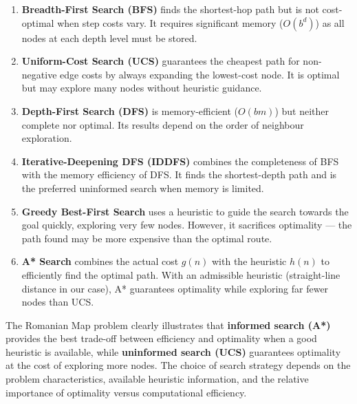 \documentclass[12pt,a4paper]{article}
\begin{document}
\begin{enumerate}
  \item \textbf{Breadth-First Search (BFS)} finds the shortest-hop path but is not cost-optimal when step costs vary. It requires significant memory ($O(b^d)$) as all nodes at each depth level must be stored.

  \item \textbf{Uniform-Cost Search (UCS)} guarantees the cheapest path for non-negative edge costs by always expanding the lowest-cost node. It is optimal but may explore many nodes without heuristic guidance.

  \item \textbf{Depth-First Search (DFS)} is memory-efficient ($O(bm)$) but neither complete nor optimal. Its results depend on the order of neighbour exploration.

  \item \textbf{Iterative-Deepening DFS (IDDFS)} combines the completeness of BFS with the memory efficiency of DFS. It finds the shortest-depth path and is the preferred uninformed search when memory is limited.

  \item \textbf{Greedy Best-First Search} uses a heuristic to guide the search towards the goal quickly, exploring very few nodes. However, it sacrifices optimality --- the path found may be more expensive than the optimal route.

  \item \textbf{A* Search} combines the actual cost $g(n)$ with the heuristic $h(n)$ to efficiently find the optimal path. With an admissible heuristic (straight-line distance in our case), A* guarantees optimality while exploring far fewer nodes than UCS.
\end{enumerate}

The Romanian Map problem clearly illustrates that \textbf{informed search (A*)} provides the best trade-off between efficiency and optimality when a good heuristic is available, while \textbf{uninformed search (UCS)} guarantees optimality at the cost of exploring more nodes. The choice of search strategy depends on the problem characteristics, available heuristic information, and the relative importance of optimality versus computational efficiency.
\end{document}
